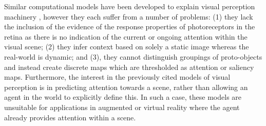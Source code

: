 Similar computational models have been developed to explain visual perception machinery \cite{Walther2006,Orabona2007a}, however they each suffer from a number of problems: (1) they lack the inclusion of the evidence of the response properties of photoreceptors in the retina as there is no indication of the current or ongoing attention within the visual scene; (2) they infer context based on solely a static image whereas the real-world is dynamic; and (3), they cannot distinguish groupings of proto-objects and instead create discrete maps which are thresholded as attention or saliency maps.  Furthermore, the interest in the previously cited models of visual perception is in predicting attention towards a scene, rather than allowing an agent in the world to explicitly define this.  In such a case, these models are unsuitable for applications in augmented or virtual reality where the agent already provides attention within a scene.  

